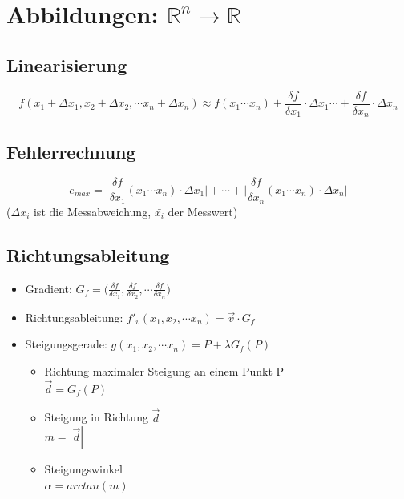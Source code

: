 \section{Abbildungen: $\mathbb{R}^n \rightarrow \mathbb{R}$}

\subsection{Linearisierung}
\begin{equation*}
	f(x_1 + \Delta x_1, x_2 + \Delta x_2, \cdots x_n + \Delta x_n) \approx f(x_1 \cdots x_n) + \frac{\delta f}{\delta x_1} \cdot \Delta x_1 \cdots + \frac{\delta f}{\delta x_n} \cdot \Delta x_n
\end{equation*}

\subsection{Fehlerrechnung}
\begin{equation*}
	e_{max} = \bigg | \frac{\delta f}{\delta x_1}(\bar{x_1} \cdots \bar{x_n}) \cdot \Delta x_1 \bigg | + \cdots + \bigg | \frac{\delta f}{\delta x_n}(\bar{x_1} \cdots \bar{x_n}) \cdot \Delta x_n \bigg |
\end{equation*}
($\Delta x_i$ ist die Messabweichung, $\bar{x_i}$ der Messwert)

\subsection{Richtungsableitung}
\begin{itemize}
	\item Gradient:
		$G_f = \big(\frac{\delta f}{\delta x_1}, \frac{\delta f}{\delta x_2}, \cdots \frac{\delta f}{\delta x_n}\big )$
	\item Richtungsableitung:
		$f'_v(x_1, x_2, \cdots x_n) = \vec{v} \cdot G_f	$
	\item Steigungsgerade:
		$g(x_1, x_2, \cdots x_n) = P + \lambda G_f(P)$

		\begin{itemize}
			\item Richtung maximaler Steigung an einem Punkt P \\
			$\vec{d} = G_f(P)$
			\item Steigung in Richtung $\vec{d}$ \\ $m = |\vec{d}|$
			\item Steigungswinkel \\ $\alpha = arctan(m)$
		\end{itemize}
\end{itemize}

